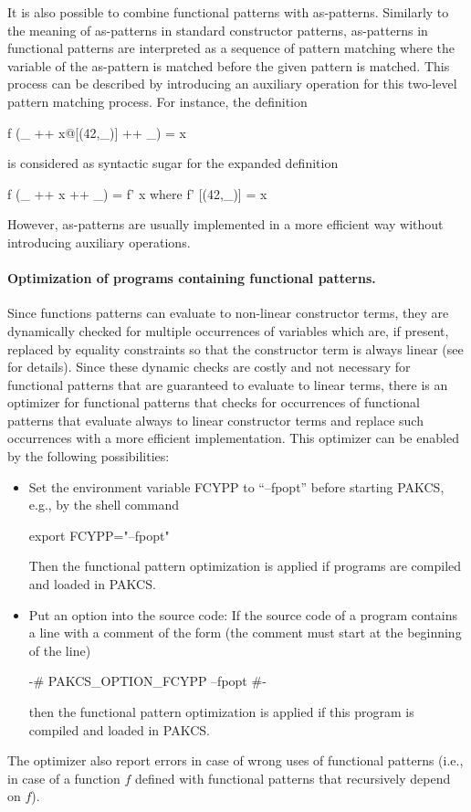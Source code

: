 \documentclass[11pt,fleqn]{article}
\makeatletter
\renewcommand{\tt}{\usefont{OT1}{cmtt}{m}{n}\selectfont}
\newcommand{\codefont}{\small\tt}
\newcommand{\code}[1]{\mbox{\codefont #1}}
\newcommand{\ccode}[1]{``\code{#1}''}
\newcommand{\pindex}[1]{\index{#1@{\tt #1}}}  %
\newcommand{\CYS}{PAKCS\xspace} %
\makeatother
\begin{document}
It is also possible to combine functional patterns with
as-patterns.\pindex{"@}
Similarly to the meaning of as-patterns
in standard constructor patterns,
as-patterns in functional patterns are interpreted
as a sequence of pattern matching where the variable of the as-pattern
is matched before the given pattern is matched.
This process can be described by introducing an auxiliary operation
for this two-level pattern matching process.
For instance, the definition
\begin{curry}
f (_ ++ x@[(42,_)] ++ _) = x
\end{curry}
is considered as syntactic sugar for the expanded definition
\begin{curry}
f (_ ++ x ++ _) = f' x
 where
  f' [(42,_)] = x
\end{curry}
However, as-patterns are usually implemented
in a more efficient way without introducing auxiliary operations.


\paragraph{Optimization of programs containing functional patterns.}
Since functions patterns can evaluate to non-linear constructor terms,
they are dynamically checked for multiple occurrences of
variables which are, if present, replaced by equality constraints
so that the constructor term is always linear
(see \cite{AntoyHanus05LOPSTR} for details).
Since these dynamic checks are costly and not necessary for
functional patterns that are guaranteed to evaluate to linear terms,
there is an optimizer for functional patterns that checks
for occurrences of functional patterns that evaluate always to
linear constructor terms and replace such occurrences
with a more efficient implementation.
This optimizer can be enabled by the following possibilities:
\begin{itemize}
\item
Set the environment variable \code{FCYPP} to \ccode{--fpopt}
before starting \CYS, e.g., by the shell command
\begin{curry}
export FCYPP="--fpopt"
\end{curry}
Then the functional pattern optimization is applied if programs are compiled
and loaded in \CYS.
\item
Put an option into the source code:
If the source code of a program
contains a line with a comment of the form (the comment
must start at the beginning of the line)
\begin{curry}
{-# PAKCS_OPTION_FCYPP --fpopt #-}
\end{curry}
then the functional pattern optimization is applied
if this program is compiled and loaded in \CYS.
\end{itemize}
The optimizer also report errors in case of wrong uses of functional patterns
(i.e., in case of a function $f$ defined with functional patterns that
recursively depend on $f$).
\end{document}
